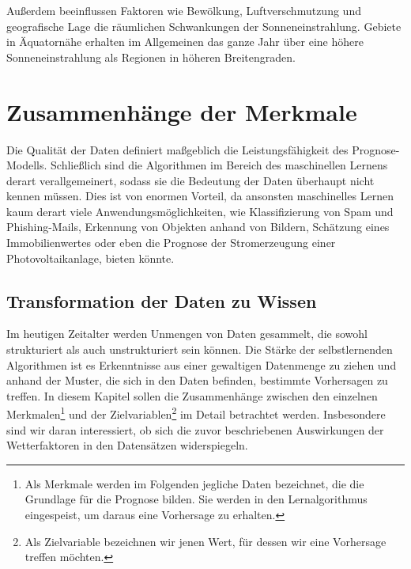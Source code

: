 \documentclass[12pt, a4paper]{article}
\begin{document}
Außerdem beeinflussen Faktoren wie Bewölkung, Luftverschmutzung und geografische Lage die räumlichen Schwankungen der Sonneneinstrahlung. Gebiete in Äquatornähe erhalten im Allgemeinen das ganze Jahr über eine höhere Sonneneinstrahlung als Regionen in höheren Breitengraden.









\newpage

\section{Zusammenhänge der Merkmale}

Die Qualität der Daten definiert maßgeblich die Leistungsfähigkeit des Prognose-Modells. Schließlich sind die Algorithmen im Bereich des maschinellen Lernens derart verallgemeinert, sodass sie die Bedeutung der Daten überhaupt nicht kennen müssen. Dies ist von enormen Vorteil, da ansonsten maschinelles Lernen kaum derart viele Anwendungsmöglichkeiten, wie Klassifizierung von Spam und Phishing-Mails, Erkennung von Objekten anhand von Bildern, Schätzung eines Immobilienwertes oder eben die Prognose der Stromerzeugung einer Photovoltaikanlage, bieten könnte.

\subsection{Transformation der Daten zu Wissen}

Im heutigen Zeitalter werden Unmengen von Daten gesammelt, die sowohl strukturiert als auch unstrukturiert sein können. Die Stärke der selbstlernenden Algorithmen ist es Erkenntnisse aus einer gewaltigen Datenmenge zu ziehen und anhand der Muster, die sich in den Daten befinden, bestimmte Vorhersagen zu treffen. In diesem Kapitel sollen die Zusammenhänge zwischen den einzelnen Merkmalen\footnote{Als Merkmale werden im Folgenden jegliche Daten bezeichnet, die die Grundlage für die Prognose bilden. Sie werden in den Lernalgorithmus eingespeist, um daraus eine Vorhersage zu erhalten.} und der Zielvariablen\footnote{Als Zielvariable bezeichnen wir jenen Wert, für dessen wir eine Vorhersage treffen möchten.} im Detail betrachtet werden. Insbesondere sind wir daran interessiert, ob sich die zuvor beschriebenen Auswirkungen der Wetterfaktoren in den Datensätzen widerspiegeln.
\end{document}

